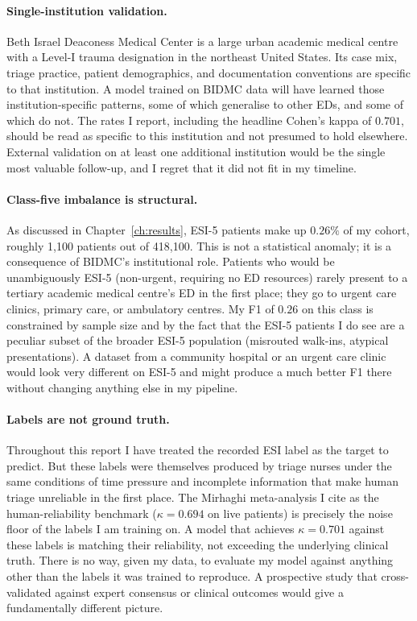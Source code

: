 \paragraph{Single-institution validation.} Beth Israel Deaconess Medical Center is a large urban academic medical centre with a Level-I trauma designation in the northeast United States. Its case mix, triage practice, patient demographics, and documentation conventions are specific to that institution. A model trained on BIDMC data will have learned those institution-specific patterns, some of which generalise to other EDs, and some of which do not. The rates I report, including the headline Cohen's kappa of $0.701$, should be read as specific to this institution and not presumed to hold elsewhere. External validation on at least one additional institution would be the single most valuable follow-up, and I regret that it did not fit in my timeline.

\paragraph{Class-five imbalance is structural.} As discussed in Chapter~\ref{ch:results}, ESI-5 patients make up $0.26\%$ of my cohort, roughly 1{,}100 patients out of 418{,}100. This is not a statistical anomaly; it is a consequence of BIDMC's institutional role. Patients who would be unambiguously ESI-5 (non-urgent, requiring no ED resources) rarely present to a tertiary academic medical centre's ED in the first place; they go to urgent care clinics, primary care, or ambulatory centres. My F1 of $0.26$ on this class is constrained by sample size and by the fact that the ESI-5 patients I do see are a peculiar subset of the broader ESI-5 population (misrouted walk-ins, atypical presentations). A dataset from a community hospital or an urgent care clinic would look very different on ESI-5 and might produce a much better F1 there without changing anything else in my pipeline.

\paragraph{Labels are not ground truth.} Throughout this report I have treated the recorded ESI label as the target to predict. But these labels were themselves produced by triage nurses under the same conditions of time pressure and incomplete information that make human triage unreliable in the first place. The Mirhaghi meta-analysis I cite as the human-reliability benchmark ($\kappa = 0.694$ on live patients) is precisely the noise floor of the labels I am training on. A model that achieves $\kappa = 0.701$ against these labels is matching their reliability, not exceeding the underlying clinical truth. There is no way, given my data, to evaluate my model against anything other than the labels it was trained to reproduce. A prospective study that cross-validated against expert consensus or clinical outcomes would give a fundamentally different picture.

